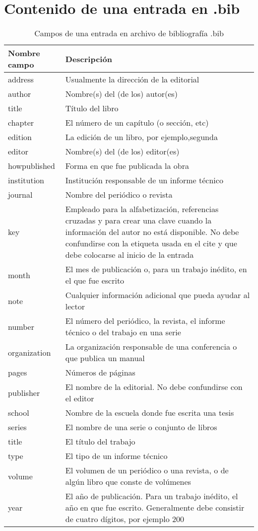 


\chapter {Contenido de una entrada en .bib}
\begin{table} 
	\begin{center}
	\begin{tabular}{l p{10cm} }
		\textbf{Nombre campo} & \textbf{Descripción} \\ \hline

address&Usualmente la dirección de la editorial\\
author&Nombre(s) del (de los) autor(es)\\
title&Título del libro\\
chapter&El número de un capítulo (o sección, etc)\\
edition&La edición de un libro, por ejemplo,segunda\\
editor&Nombre(s) del (de los) editor(es)\\
howpublished&Forma en que fue publicada la obra\\
institution&Institución responsable de un informe técnico\\
journal&Nombre del periódico o revista\\
key&Empleado para la alfabetización, referencias cruzadas y para crear una clave cuando la información del autor no está disponible. No debe confundirse con la etiqueta usada en el cite y que debe colocarse al inicio de la entrada\\
month&El mes de publicación o, para un trabajo inédito, en el que fue escrito\\
note&Cualquier información adicional que pueda ayudar al lector\\
number&El número del periódico, la revista, el informe técnico o del trabajo en una serie\\
organization&La organización responsable de una conferencia o que publica un manual\\
pages&Números de páginas\\
publisher&El nombre de la editorial. No debe confundirse con el editor\\
school&Nombre de la escuela donde fue escrita una tesis\\
series&El nombre de una serie o conjunto de libros\\
title&El título del trabajo\\
type&El tipo de un informe técnico\\
volume&El volumen de un periódico o una revista, o de algún libro que conste de volúmenes\\
year&El año de publicación. Para un trabajo inédito, el año en que fue escrito. Generalmente debe consistir de cuatro dígitos, por ejemplo 200\\
         \hline
	\end{tabular}
	\end{center}
	\caption{Campos de una entrada en archivo de bibliografía .bib}
\end{table}



